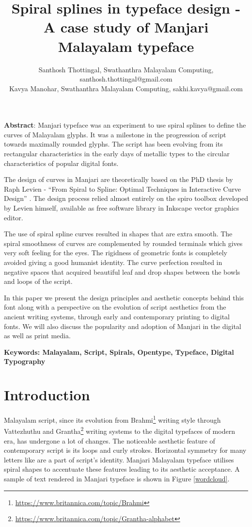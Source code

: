 \documentclass[11pt,twoside,a4paper]{article}
\title{Spiral splines in typeface design - A case study of Manjari Malayalam typeface}
\author{%
Santhosh Thottingal, Swathanthra Malayalam Computing, santhosh.thottingal@gmail.com\\
Kavya Manohar, Swathanthra Malayalam Computing, sakhi.kavya@gmail.com
}
\begin{document}
\maketitle

\textbf{Abstract}: Manjari typeface was an experiment to use spiral splines to define the curves of Malayalam glyphs. It was a milestone in the progression of script towards maximally rounded glyphs. The script has been evolving from its rectangular characteristics in the early days of metallic types to the circular characteristics of popular digital fonts. 

The design of curves in Manjari are theoretically based on the PhD thesis by Raph Levien - ``From Spiral to Spline: Optimal Techniques in Interactive Curve Design” \cite{levien}. The design process relied almost entirely on the spiro toolbox developed by Levien himself, available as free software library in Inkscape vector graphics editor.

The use of spiral spline curves resulted in shapes that are extra smooth. The spiral smoothness of curves are complemented by rounded terminals which gives very soft feeling for the eyes. The rigidness of geometric fonts is completely avoided giving a good humanist identity. The curve perfection resulted in negative spaces that acquired beautiful leaf and drop shapes between the bowls and loops of the script. 

In this paper we present the design principles and aesthetic concepts behind this font along with a perspective on the evolution of script aesthetics from the ancient writing systems, through early and contemporary printing to digital fonts. We will also discuss the popularity and adoption of Manjari in the digital as well as print media.

\textbf{Keywords: Malayalam, Script, Spirals, Opentype, Typeface, Digital Typography}

\section{Introduction}

Malayalam script, since its evolution from Brahmi\footnote{\url{https://www.britannica.com/topic/Brahmi}} writing style through Vattezhuthu and Grantha\footnote{\url{https://www.britannica.com/topic/Grantha-alphabet}} writing systems to the digital typefaces of modern era, has undergone a lot of changes. The noticeable aesthetic feature of contemporary script is its loops and curly strokes. Horizontal symmetry for many letters like {} are a part of script's identity. Manjari Malayalam typeface utilises spiral shapes to accentuate these features leading to its aesthetic acceptance. A sample of text rendered in Manjari typeface is shown in Figure \ref{wordcloud}.
\end{document}
